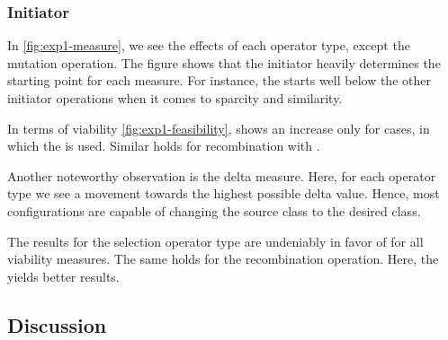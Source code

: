 \documentclass[./../../paper.tex]{subfiles}
\begin{document}
\subsubsection{Initiator}
In \autoref{fig:exp1-measure}, we see the effects of each operator type, except the mutation operation. The figure shows that the initiator heavily determines the starting point for each measure. For instance, the  starts well below the other initiator operations when it comes to sparcity and similarity. 

In terms of viability \autoref{fig:exp1-feasibility}, shows an increase only for cases, in which the  is used. Similar holds for recombination with .

Another noteworthy observation is the delta measure. Here, for each operator type we see a movement towards the highest possible delta value. Hence, most configurations are capable of changing the source class to the desired class. 

The results for the selection operator type are undeniably in favor of  for all viability measures. The same holds for the recombination operation. Here, the  yields better results.

\subsection{Discussion}
\end{document}
